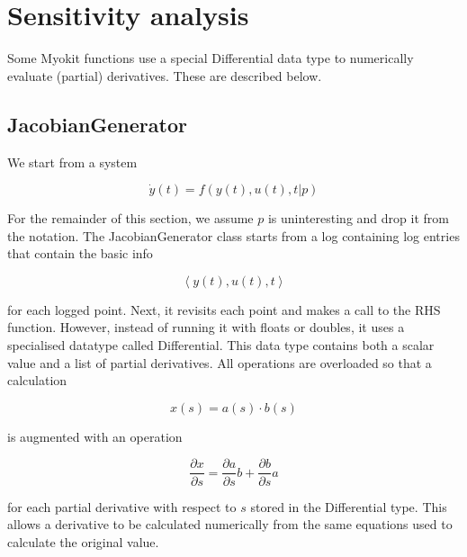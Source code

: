 
%
%
%
%
\section{Sensitivity analysis}

Some Myokit functions use a special Differential data type to numerically
evaluate (partial) derivatives. These are described below.


\subsection{JacobianGenerator}

We start from a system
\begin{linenomath}
\begin{equation}
\dot{y}\left(t\right)=f\left(y\left(t\right),u\left(t\right),t|p\right)
\end{equation}
\end{linenomath}
For the remainder of this section, we assume $p$ is uninteresting
and drop it from the notation. The JacobianGenerator class starts
from a log containing log entries that contain the basic info
\begin{linenomath}
\begin{equation}
\left\langle y\left(t\right),u\left(t\right),t\right\rangle
\end{equation}
\end{linenomath}
for each logged point. Next, it revisits each point and makes a call
to the RHS function. However, instead of running it with floats or
doubles, it uses a specialised datatype called Differential. This
data type contains both a scalar value and a list of partial derivatives.
All operations are overloaded so that a calculation
\begin{linenomath}
\begin{equation}
x\left(s\right)=a\left(s\right)\cdot b\left(s\right)
\end{equation}
\end{linenomath}
is augmented with an operation
\begin{linenomath}
\begin{equation}
\frac{\partial x}{\partial s}=\frac{\partial a}{\partial s}b+\frac{\partial b}{\partial s}a
\end{equation}
\end{linenomath}
for each partial derivative with respect to $s$ stored in the Differential
type. This allows a derivative to be calculated numerically from the
same equations used to calculate the original value.

